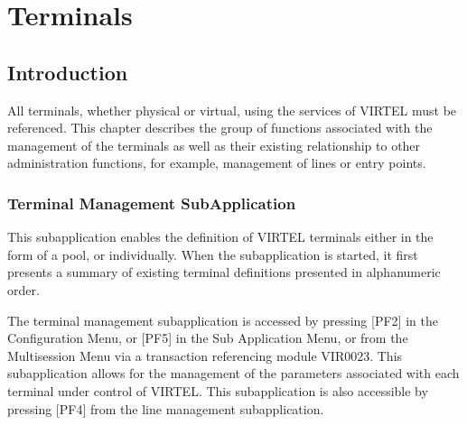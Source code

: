 \documentclass[letterpaper,10pt,english]{sphinxmanual}
\begin{document}
\ignorespaces 

\chapter{Terminals}
\label{\detokenize{connectivity_guide:terminals}}\label{\detokenize{connectivity_guide:index-94}}

\section{Introduction}
\label{\detokenize{connectivity_guide:id48}}
\sphinxAtStartPar
All terminals, whether physical or virtual, using the services of VIRTEL must be referenced. This chapter describes the group of functions associated with the management of the terminals as well as their existing relationship to other administration functions, for example, management of lines or entry points.

\ignorespaces 

\subsection{Terminal Management Sub\sphinxhyphen{}Application}
\label{\detokenize{connectivity_guide:terminal-management-sub-application}}\label{\detokenize{connectivity_guide:index-95}}
\sphinxAtStartPar
This sub\sphinxhyphen{}application enables the definition of VIRTEL terminals either in the form of a pool, or individually. When the sub\sphinxhyphen{}application is started, it first presents a summary of existing terminal definitions presented in alphanumeric order.

\sphinxAtStartPar
The terminal management sub\sphinxhyphen{}application is accessed by pressing {[}PF2{]} in the Configuration Menu, or {[}PF5{]} in the Sub Application Menu, or from the Multi\sphinxhyphen{}session Menu via a transaction referencing module VIR0023. This sub\sphinxhyphen{}application allows for the management of the parameters associated with each terminal under control of VIRTEL. This subapplication
is also accessible by pressing {[}PF4{]} from the line management sub\sphinxhyphen{}application.

\ignorespaces 
\end{document}
